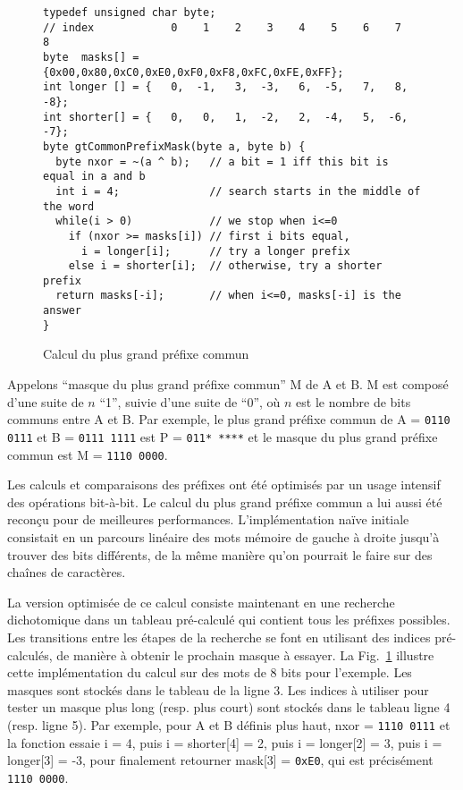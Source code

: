 \begin{figure}[h]
\begin{lstlisting}
typedef unsigned char byte;
// index            0    1    2    3    4    5    6    7    8
byte  masks[] = {0x00,0x80,0xC0,0xE0,0xF0,0xF8,0xFC,0xFE,0xFF};
int longer [] = {   0,  -1,   3,  -3,   6,  -5,   7,   8,  -8};
int shorter[] = {   0,   0,   1,  -2,   2,  -4,   5,  -6,  -7};
byte gtCommonPrefixMask(byte a, byte b) {
  byte nxor = ~(a ^ b);   // a bit = 1 iff this bit is equal in a and b
  int i = 4;              // search starts in the middle of the word
  while(i > 0)            // we stop when i<=0
    if (nxor >= masks[i]) // first i bits equal,
      i = longer[i];      // try a longer prefix 
    else i = shorter[i];  // otherwise, try a shorter prefix 
  return masks[-i];       // when i<=0, masks[-i] is the answer
}
\end{lstlisting}
\caption{Calcul du plus grand préfixe commun}
\label{fig:prefix}
\end{figure}


Appelons ``masque du plus grand préfixe commun'' M de A et B. M est composé
d'une suite de $n$ ``1'', suivie d'une suite de ``0'', où $n$ est le nombre de
bits communs entre A et B. Par exemple, le plus grand préfixe commun de
A = \texttt{0110\,0111} et B = \texttt{0111\,1111} est P = \texttt{011*\,****}
et le masque du plus grand préfixe commun est M = \texttt{1110\,0000}.

Les calculs et comparaisons des préfixes ont été optimisés par un usage
intensif des opérations bit-à-bit. Le calcul du plus grand préfixe commun a lui
aussi été reconçu pour de meilleures performances. L'implémentation naïve
initiale consistait en un parcours linéaire des mots mémoire de gauche à droite
jusqu'à trouver des bits différents, de la même manière qu'on pourrait le faire 
sur des chaînes de caractères.

La version optimisée de ce calcul consiste
maintenant en une recherche dichotomique dans un tableau pré-calculé qui
contient tous les préfixes possibles. Les transitions entre les étapes de la
recherche se font en utilisant des indices pré-calculés, de manière à obtenir
le prochain masque à essayer. La Fig.~\ref{fig:prefix} illustre cette
implémentation du calcul sur des mots de 8 bits pour l'exemple. Les masques sont
stockés dans le tableau de la ligne 3. Les indices à utiliser pour tester un
masque plus long (resp. plus court) sont stockés dans le tableau ligne 4 (resp.
ligne 5). Par exemple, pour A et B définis plus haut, nxor = \texttt{1110\,0111}
et la fonction essaie i = 4, puis i = shorter[4] = 2, puis i = longer[2] = 3,
puis i = longer[3] = -3, pour finalement retourner mask[3] = \texttt{0xE0}, qui
est précisément \texttt{1110\,0000}.



